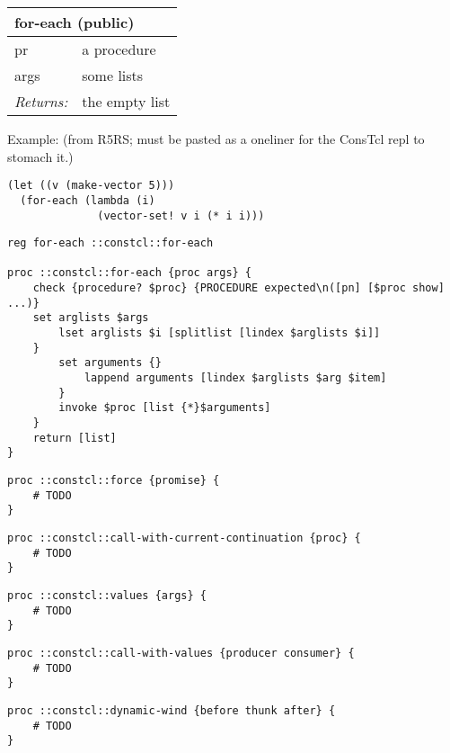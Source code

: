 \documentclass{report}
\begin{document}
\begin{tabular}{ |l l| }
\hline
\multicolumn{2}{|l|}{for-each (public)} \\
\hline
pr & a procedure \\
args & some lists \\
\textit{Returns:} & the empty list \\
\hline
\end{tabular}


Example: (from R5RS; must be pasted as a oneliner for the ConsTcl repl to stomach it.)

\noindent\makebox[\linewidth]{\rule{\linewidth}{0.4pt}}
\begin{lstlisting}
(let ((v (make-vector 5)))
  (for-each (lambda (i)
              (vector-set! v i (* i i)))
\end{lstlisting}
\noindent\makebox[\linewidth]{\rule{\linewidth}{0.4pt}}
\noindent\makebox[\linewidth]{\rule{\linewidth}{0.4pt}}
\begin{lstlisting}
reg for-each ::constcl::for-each
 
proc ::constcl::for-each {proc args} {
    check {procedure? $proc} {PROCEDURE expected\n([pn] [$proc show] ...)}
    set arglists $args
        lset arglists $i [splitlist [lindex $arglists $i]]
    }
        set arguments {}
            lappend arguments [lindex $arglists $arg $item]
        }
        invoke $proc [list {*}$arguments]
    }
    return [list]
}
\end{lstlisting}
\noindent\makebox[\linewidth]{\rule{\linewidth}{0.4pt}}
\noindent\makebox[\linewidth]{\rule{\linewidth}{0.4pt}}
\begin{lstlisting}
proc ::constcl::force {promise} {
    # TODO
}
\end{lstlisting}
\noindent\makebox[\linewidth]{\rule{\linewidth}{0.4pt}}
\noindent\makebox[\linewidth]{\rule{\linewidth}{0.4pt}}
\begin{lstlisting}
proc ::constcl::call-with-current-continuation {proc} {
    # TODO
}
\end{lstlisting}
\noindent\makebox[\linewidth]{\rule{\linewidth}{0.4pt}}
\noindent\makebox[\linewidth]{\rule{\linewidth}{0.4pt}}
\begin{lstlisting}
proc ::constcl::values {args} {
    # TODO
}
\end{lstlisting}
\noindent\makebox[\linewidth]{\rule{\linewidth}{0.4pt}}
\noindent\makebox[\linewidth]{\rule{\linewidth}{0.4pt}}
\begin{lstlisting}
proc ::constcl::call-with-values {producer consumer} {
    # TODO
}
\end{lstlisting}
\noindent\makebox[\linewidth]{\rule{\linewidth}{0.4pt}}
\noindent\makebox[\linewidth]{\rule{\linewidth}{0.4pt}}
\begin{lstlisting}
proc ::constcl::dynamic-wind {before thunk after} {
    # TODO
}
\end{lstlisting}
\noindent\makebox[\linewidth]{\rule{\linewidth}{0.4pt}}
\end{document}
